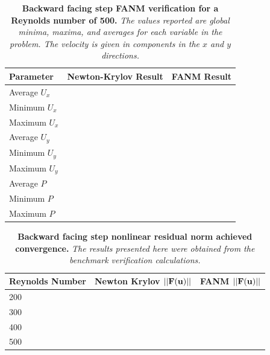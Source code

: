 \begin{table}[h!]
  \begin{center}
    \begin{tabular}{lll}\hline\hline
      \multicolumn{1}{l}{Parameter}& 
      \multicolumn{1}{l}{Newton-Krylov Result}&
      \multicolumn{1}{l}{FANM Result}\\
      \hline
      Average $U_x$ & \\
      Minimum $U_x$ & \\
      Maximum $U_x$ & \\
      \hline
      Average $U_y$ & \\
      Minimum $U_y$ & \\
      Maximum $U_y$ & \\
      \hline
      Average $P$ & \\
      Minimum $P$ & \\
      Maximum $P$ & \\
      \hline\hline
    \end{tabular}
  \end{center}
  \caption{\textbf{Backward facing step FANM verification for a
      Reynolds number of 500.} \textit{The values reported are global
      minima, maxima, and averages for each variable in the
      problem. The velocity is given in components in the $x$ and $y$
      directions.}}
  \label{tab:step_re500_results}
\end{table}

\begin{table}[h!]
  \begin{center}
    \begin{tabular}{lcc}\hline\hline
      \multicolumn{1}{l}{Reynolds Number}& 
      \multicolumn{1}{c}{Newton Krylov $||\mathbf{F(\mathbf{u})}||$}&
      \multicolumn{1}{c}{FANM $||\mathbf{F(\mathbf{u})}||$}\\
      \hline
      200 & \\
      300 & \\
      400 & \\
      500 & \\
      \hline\hline
    \end{tabular}
  \end{center}
  \caption{\textbf{Backward facing step nonlinear residual norm
      achieved convergence.} \textit{The results presented here were
      obtained from the benchmark verification calculations.}}
  \label{tab:step_residual_norm_comparison}
\end{table}

